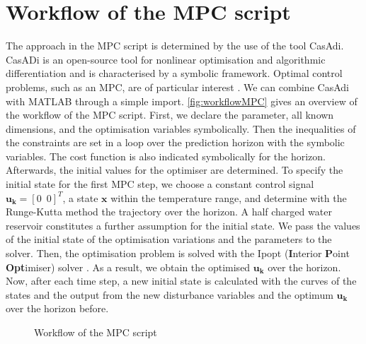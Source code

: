 \section{Workflow of the MPC script}
\label{section:workflowMPC}
The approach in the MPC script is determined by the use of the tool CasAdi. CasADi is an open-source tool for nonlinear optimisation and algorithmic differentiation and is characterised by a symbolic framework. Optimal control problems, such as an MPC, are of particular interest \cite{JoelA.E.Andersson.2018}. We can combine CasAdi with MATLAB through a simple import.\newline
\autoref{fig:workflowMPC} gives an overview of the workflow of the MPC script. First, we declare the parameter, all known dimensions, and the optimisation variables symbolically. Then the inequalities of the constraints are set in a loop over the prediction horizon with the symbolic variables. The cost function is also indicated symbolically for the horizon. Afterwards, the initial values for the optimiser are determined. To specify the initial state for the first MPC step, we choose a constant control signal $\mathbf{u_k} = [0\enspace0]^T$, a state $\mathbf{x}$ within the temperature range, and determine with the Runge-Kutta method the trajectory over the horizon. A half charged water reservoir constitutes a further assumption for the initial state. We pass the values of the initial state of the optimisation variations and the parameters to the solver. Then, the optimisation problem is solved with the Ipopt (\textbf{I}nterior \textbf{P}oint \textbf{Opt}imiser) solver \cite{JoelA.E.Andersson.2018}. As a result, we obtain the optimised $\mathbf{u_k}$ over the horizon. Now, after each time step, a new initial state is calculated with the curves of the states and the output from the new disturbance variables and the optimum $\mathbf{u_k}$ over the horizon before.
    \begin{figure}[h]
            \centering
            \def\svgwidth{0.75\textwidth}
            
            \caption{Workflow of the MPC script}
            \label{fig:workflowMPC}
    \end{figure}
    
